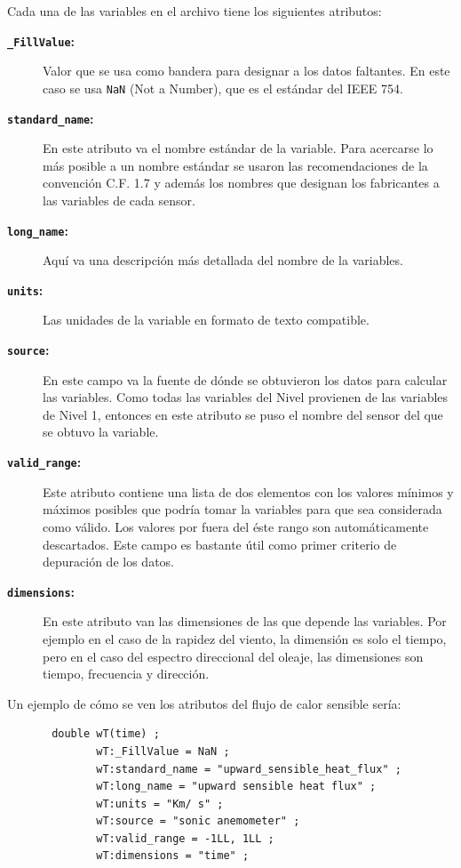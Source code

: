 \documentclass[11pt]{article}
\begin{document}
Cada una de las variables en el archivo tiene los siguientes atributos:
\begin{description}
  \item[\textbf{\texttt{\_FillValue}:}]
    Valor que se usa como bandera para designar a los datos faltantes. En este
    caso se usa \texttt{NaN} (Not a Number), que es el estándar del IEEE 754.

  \item[\textbf{\texttt{standard\_name}:}]
    En este atributo va el nombre estándar de la variable. Para acercarse lo más
    posible a un nombre estándar se usaron las recomendaciones de la convención
    C.F. 1.7 y además los nombres que designan los fabricantes a las variables
    de cada sensor. 

  \item[\textbf{\texttt{long\_name}:}]
    Aquí va una descripción más detallada del nombre de la variables.

  \item[\textbf{\texttt{units}:}]
    Las unidades de la variable en formato de texto compatible.

  \item[\textbf{\texttt{source}:}]
    En este campo va la fuente de dónde se obtuvieron los datos para calcular
    las variables. Como todas las variables del Nivel provienen de las variables
    de Nivel 1, entonces en este atributo se puso el nombre del sensor del que
    se obtuvo la variable.

  \item[\textbf{\texttt{valid\_range}:}]
    Este atributo contiene una lista de dos elementos con los valores mínimos y
    máximos posibles que podría tomar la variables para que sea considerada como
    válido. Los valores por fuera del éste rango son automáticamente
    descartados. Este campo es bastante útil como primer criterio de depuración
    de los datos.

  \item[\textbf{\texttt{dimensions}:}]
    En este atributo van las dimensiones de las que depende las variables. Por
    ejemplo en el caso de la rapidez del viento, la dimensión es solo el tiempo,
    pero en el caso del espectro direccional del oleaje, las dimensiones son
    tiempo, frecuencia y dirección.

\end{description}


Un ejemplo de cómo se ven los atributos del flujo de calor sensible sería:

\begin{verbatim}
       double wT(time) ;
              wT:_FillValue = NaN ;
              wT:standard_name = "upward_sensible_heat_flux" ;
              wT:long_name = "upward sensible heat flux" ;
              wT:units = "Km/ s" ;
              wT:source = "sonic anemometer" ;
              wT:valid_range = -1LL, 1LL ;
              wT:dimensions = "time" ; 
\end{verbatim}






\end{document}
